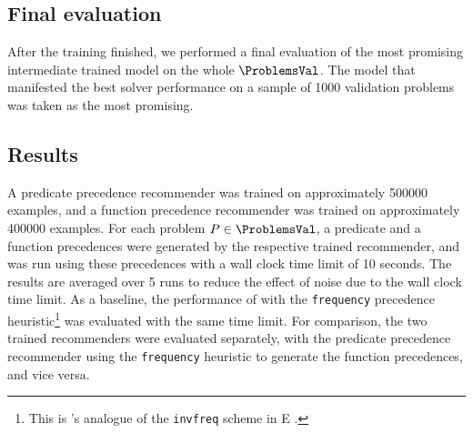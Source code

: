 \subsection{Final evaluation}

After the training finished,
we performed a final evaluation of the most promising intermediate trained model on the whole $\ProblemsVal$.
The model that manifested the best solver performance on a sample of \num{1000} validation problems
was taken as the most promising.

\subsection{Results}

A predicate precedence recommender was trained on approximately \num{500000} examples,
and a function precedence recommender was trained on approximately \num{400000} examples.
For each problem $P \in \ProblemsVal$,
a predicate and a function precedences
were generated by the respective trained recommender,
and \Vampire{} was run using these precedences
with a wall clock time limit of 10 seconds.
The results are averaged over 5 runs to reduce the effect of noise due to the wall clock time limit.
As a baseline, the performance of \Vampire{} with the \texttt{frequency} precedence heuristic\footnote{
This is \Vampire{}'s analogue of the \texttt{invfreq} scheme in E \cite{E-manual}.}
was evaluated with the same time limit.
For comparison, the two trained recommenders were evaluated separately,
with the predicate precedence recommender using the \texttt{frequency} heuristic to generate the function precedences, and vice versa.

